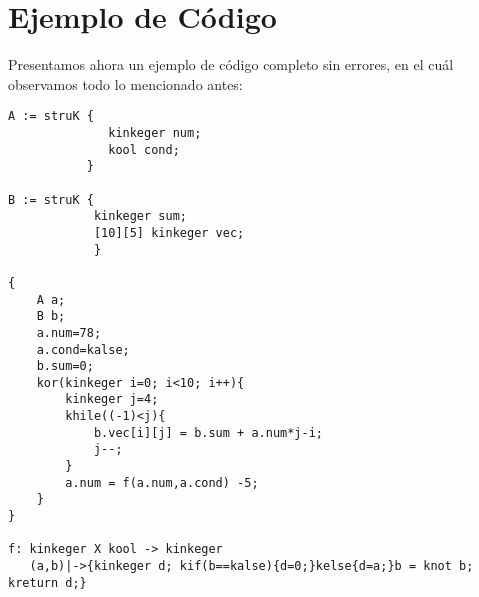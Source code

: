 \documentclass[a4paper, 11pt, twoside, openany, onecolumn, final]{memoir}
\begin{document}
	 \section{Ejemplo de Código}
	 Presentamos ahora un ejemplo de código completo sin errores, en el cuál observamos todo lo mencionado antes:
\begin{verbatim}
A := struK {
              kinkeger num;
              kool cond;
           }
           
B := struK {
            kinkeger sum;
            [10][5] kinkeger vec;
            }
			
{
    A a;
    B b;
    a.num=78;
    a.cond=kalse;
    b.sum=0;
    kor(kinkeger i=0; i<10; i++){
        kinkeger j=4;
        khile((-1)<j){
            b.vec[i][j] = b.sum + a.num*j-i;
            j--;
        }
        a.num = f(a.num,a.cond) -5;	
    }
}

f: kinkeger X kool -> kinkeger
   (a,b)|->{kinkeger d; kif(b==kalse){d=0;}kelse{d=a;}b = knot b; kreturn d;}  
\end{verbatim}
	
\end{document}
